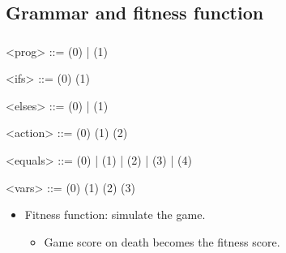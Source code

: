 \documentclass{beamer}
\makeatletter
\newcommand*{\currentname}{\@currentlabelname}
\makeatother
\begin{document}
\subsection{Grammar and fitness function}
\begin{frame}
\frametitle{\currentname}

\begin{grammar}
\small
<prog>      ::=   (0) |   (1) 				   \hspace{1em}

<ifs>     ::=    
				  \lit*{ )\{ }  \lit*{ \}}	\hfill (0) \hspace{1em}
		\alt   {}   
				  \lit*{ )\{ }  \lit*{ \}}	\hfill (1) \hspace{1em}
				 
<elses>   ::=       \lit*{ \}}  (0) |
			      \lit*{ \}}  (1)


<action> ::=   						  	\hfill (0) \hspace{1em}
		 \alt {} 					\hfill (1) \hspace{1em}
		 \alt {} 					\hfill (2) \hspace{1em}
		 
<equals> ::=  \lit*{<} (0)  | \lit*{<=} (1) | \lit*{>} (2) 
		 | \lit*{>=} (3) | \lit*{==} (4)								   \hspace{1em}

<vars> ::=   						  	\hfill (0) \hspace{1em}
	   \alt {} 							\hfill (1) \hspace{1em}
	   \alt {} 							\hfill (2) \hspace{1em}
 	   \alt {} 										\hfill (3) \hspace{1em}
 	   
\end{grammar}
\vspace{-1em}
\begin{itemize}
	\item Fitness function: simulate the game.
	\begin{itemize}
		\item Game score on death becomes the fitness score.
	\end{itemize}
\end{itemize}


\end{frame}
\end{document}
